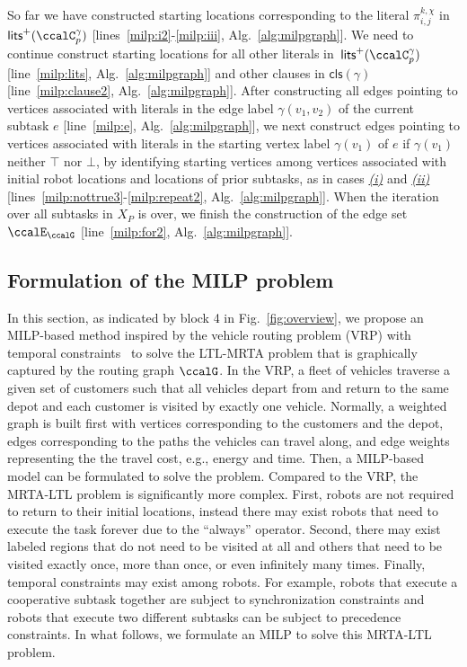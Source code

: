 \documentclass[Afour,sageh,times]{sagej}
\newcommand{\clause}[1]{\mathsf{cls}(#1)}
\renewcommand{\ap}[3]{\mathcal{\pi}_{{#1},{#2}}^{#3}}
\begin{document}
So far we have constructed starting locations corresponding to the literal $\ap{i}{j}{k,\chi}$ in $\mathsf{lits}^+(\ccalC_p^{\gamma})$ [lines~\ref{milp:i2}-\ref{milp:iii}, Alg.~\ref{alg:milpgraph}]. We need to continue construct starting locations for all other literals in~$\mathsf{lits}^+(\ccalC_p^{\gamma})$ [line~\ref{milp:lits},  Alg.~\ref{alg:milpgraph}] and other clauses in $\clause{\gamma}$ [line~\ref{milp:clause2},  Alg.~\ref{alg:milpgraph}].
After constructing all edges pointing to vertices associated with literals in the edge label $\gamma(v_1, v_2)$ of the current subtask $e$ [line~\ref{milp:e},  Alg.~\ref{alg:milpgraph}], we next construct  edges pointing to vertices associated with literals in the starting vertex label $\gamma(v_1)$ of $e$ if $\gamma(v_1)$ neither $\top$ nor $\bot$, by identifying starting vertices among vertices associated with initial robot locations and locations of prior subtasks, as in cases \hyperref[sec:a]{\it (i)} and \hyperref[sec:b]{\it (ii)} [lines~\ref{milp:nottrue3}-\ref{milp:repeat2},  Alg.~\ref{alg:milpgraph}]. When the iteration over all subtasks in $X_{P}$ is over, we finish the construction of  the edge set $\ccalE_\ccalG$ [line~\ref{milp:for2},  Alg.~\ref{alg:milpgraph}].

 \subsection{Formulation of the MILP problem}\label{sec:milp}
 In this section, as indicated by block 4 in Fig.~\ref{fig:overview}, we propose an MILP-based method inspired by the vehicle routing problem (VRP) with temporal constraints~\cite{bredstrom2008combined} to solve the LTL-MRTA problem that is graphically captured by the routing graph $\ccalG$. In the VRP, a fleet of vehicles traverse a given set of customers such that all vehicles depart from and return to the same depot and each customer is visited by exactly one vehicle. Normally, a weighted graph is built first with vertices corresponding to the customers and the depot, edges corresponding to the paths the vehicles can travel along, and edge weights representing the the travel cost, e.g., energy and time. Then,  a MILP-based model can be formulated to solve the problem. Compared to the VRP, the MRTA-LTL problem is significantly more complex. First, robots are not required  to return to their initial locations, instead there may exist robots that need to execute the task forever due to the  ``always'' operator. Second, there may exist  labeled regions that do not need to be  visited at all and others that need to be visited exactly once,  more than once, or even infinitely  many times. Finally, temporal constraints may exist  among robots. For example, robots that execute a cooperative subtask together are subject to synchronization constraints and robots that execute two different subtasks can be subject to precedence constraints. In what follows, we formulate an MILP to solve this MRTA-LTL problem.
\end{document}
